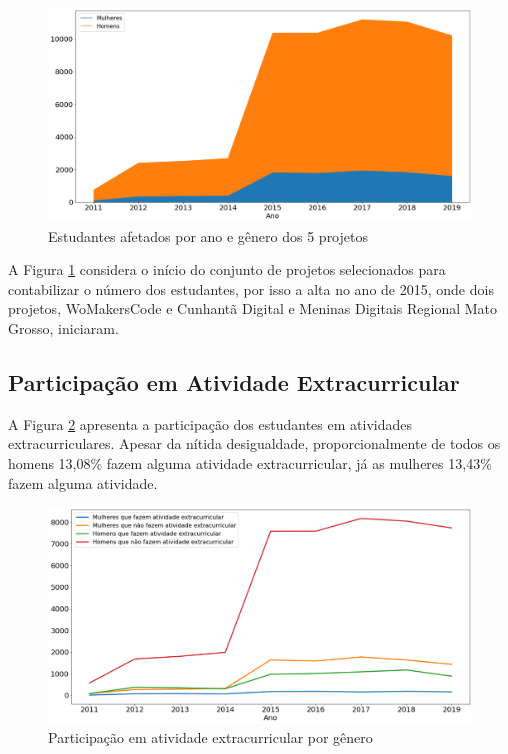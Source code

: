\begin{figure}[H]
\centering
\includegraphics[width=1\textwidth]{Figuras/homensMulheresCincoProjetos.png}
\caption{Estudantes afetados por ano e gênero dos 5 projetos}
\label{fig:homensMulheresCincoProjetos}
\end{figure}

A Figura \ref{fig:homensMulheresCincoProjetos} considera o início do conjunto de projetos selecionados para contabilizar o número dos estudantes, por isso a alta no ano de 2015, onde dois projetos, WoMakersCode e Cunhantã Digital e Meninas Digitais Regional Mato Grosso, iniciaram.

\subsection{Participação em Atividade Extracurricular}\label{sub:extracurricular}

A Figura \ref{fig:extraCurricular} apresenta a participação dos estudantes em atividades extracurriculares. Apesar da nítida desigualdade, proporcionalmente de todos os homens 13,08\% fazem alguma atividade extracurricular, já as mulheres  13,43\% fazem alguma atividade. 

\begin{figure}[H]
\centering
\includegraphics[width=1\textwidth]{Figuras/extraCurricular.png}
\caption{Participação em atividade extracurricular por gênero}
\label{fig:extraCurricular}
\end{figure}

